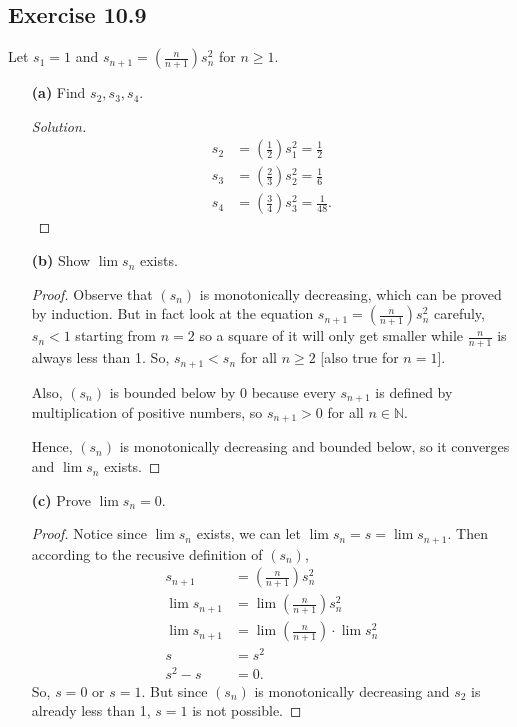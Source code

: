 \documentclass{article}
\begin{document}
\subsection*{Exercise 10.9}
Let $s_1=1$ and $s_{n+1}=\left(\frac{n}{n+1}\right)s_n^2$ for $n\ge 1$.
\begin{enumerate}
    \item [\textbf{(a)}]
    Find $s_2, s_3, s_4$.
    \begin{proof}[Solution]
        \begin{align*}
            s_2 & = \left(\frac{1}{2}\right)s_1^2 = \frac{1}{2} \\
            s_3 & = \left(\frac{2}{3}\right)s_2^2 = \frac{1}{6} \\
            s_4 & = \left(\frac{3}{4}\right)s_3^2 = \frac{1}{48}.
        \end{align*}
    \end{proof}

    \item[\textbf{(b)}]
    Show $\lim s_n$ exists. 
    \begin{proof}
        Observe that $(s_n)$ is monotonically decreasing, which can be proved by 
        induction. But in fact look at the equation $s_{n+1}=\left(\frac{n}{n+1}\right)s_n^2$ carefuly, 
        $s_n < 1$ starting from $n=2$ so a square of it will only get smaller while $\frac{n}{n+1}$ is 
        always less than 1. So, $s_{n+1}<s_n$ for all $n\ge 2$ [also true for $n=1$].

        Also, $(s_n)$ is bounded below by 0 because every $s_{n+1}$ is defined by multiplication of 
        positive numbers, so $s_{n+1}>0$ for all $n\in\mathbb{N}$.

        Hence, $(s_n)$ is monotonically decreasing and bounded below, so it converges and $\lim s_n$
        exists.
    \end{proof}

    \item[\textbf{(c)}]
    Prove $\lim s_n=0$.
    \begin{proof}
        Notice since $\lim s_n$ exists, we can let $\lim s_n = s = \lim s_{n+1}$. 
        Then according to the recusive definition of $(s_n)$,
        \begin{align*}
            s_{n+1} & = \left(\frac{n}{n+1}\right)s_n^2 \\
            \lim s_{n+1} & = \lim \left(\frac{n}{n+1}\right)s_n^2 \\
            \lim s_{n+1} & = \lim \left(\frac{n}{n+1}\right)\cdot \lim s_n^2 \\
            s & = s^2 \\
            s^2 - s & = 0.
        \end{align*}
        So, $s=0$ or $s=1$. But since $(s_n)$ is monotonically decreasing and $s_2$ is already less 
        than 1, $s=1$ is not possible.


\end{proof}
\end{enumerate}
\end{document}
